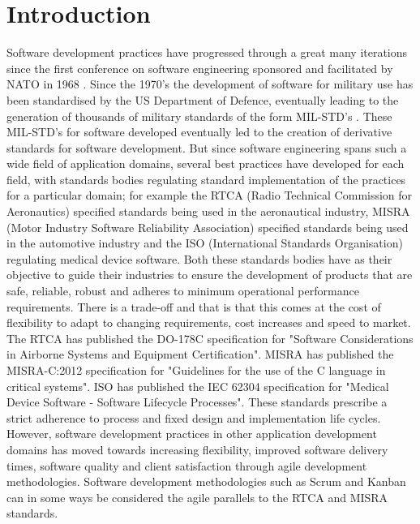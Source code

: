 \documentclass{sig-alternate-05-2015}
\begin{document}
\section{Introduction}
Software development practices have progressed through a great many iterations since the first conference on software engineering sponsored and facilitated by NATO in 1968 \cite{Bauer_1968}. Since the 1970's the development of software for military use has been standardised by the US Department of Defence, eventually leading to the generation of thousands of military standards of the form MIL-STD's \cite{McDonald_2010}. These MIL-STD's for software developed eventually led to the creation of derivative standards for software development. 
\break
\break
But since software engineering spans such a wide field of application domains, several best practices have developed for each field, with standards bodies regulating standard implementation of the practices for a particular domain; for example the RTCA (Radio Technical Commission for Aeronautics) specified standards being used in the aeronautical industry, MISRA (Motor Industry Software Reliability Association) specified standards being used in the automotive industry and the ISO (International Standards Organisation) regulating medical device software.  Both these standards bodies have as their objective to guide their industries to ensure the development of products that are safe, reliable, robust and adheres to minimum operational performance requirements. There is a trade-off and that is that this comes at the cost of flexibility to adapt to changing requirements, cost increases and speed to market.
\break
\break
The RTCA has published the DO-178C \cite{RTCA_2012} specification for "Software Considerations in Airborne Systems and Equipment Certification". MISRA has published the MISRA-C:2012 \cite{MISRA_2012} specification for "Guidelines for the use of the C language in critical systems". ISO has published the IEC 62304 \cite{Jordan_2006} specification for "Medical Device Software - Software Lifecycle Processes".
\break
\break
These standards prescribe a strict adherence to process and fixed design and implementation life cycles. However, software development practices in other application development domains has moved towards increasing flexibility, improved software delivery times, software quality and client satisfaction through agile development methodologies\cite{Armbrust_2011}. Software development methodologies such as Scrum and Kanban can in some ways be considered the agile parallels to the RTCA and MISRA standards.
\end{document}
